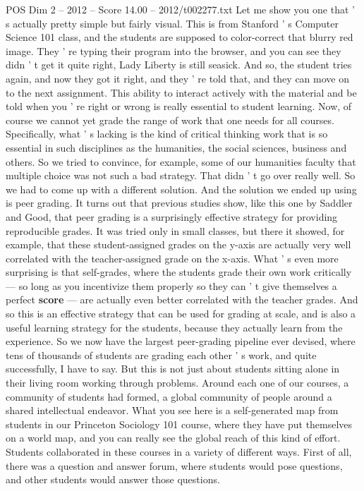 \begin{textsample}{POS Dim 2 – 2012 – Score 14.00 – 2012/t002277.txt}
Let me show you one that ' s actually pretty simple but fairly visual.
This is from Stanford ' s Computer Science 101 class, and the students are supposed to color-correct that blurry red image.
They ' re typing their program into the browser, and you can see they didn ' t get it quite right, Lady Liberty is still seasick.
And so, the student tries again, and now they got it right, and they ' re told that, and they can move on to the next assignment.
This ability to interact actively with the material and be told when you ' re right or wrong is really essential to student learning.
Now, of course we cannot yet grade the range of work that one needs for all courses.
Specifically, what ' s lacking is the kind of critical thinking work that is so essential in such disciplines as the humanities, the social sciences, business and others.
So we tried to convince, for example, some of our humanities faculty that multiple choice was not such a bad strategy.
That didn ' t go over really well.
So we had to come up with a different solution.
And the solution we ended up using is peer grading.
It turns out that previous studies show, like this one by Saddler and Good, that peer grading is a surprisingly effective strategy for providing reproducible grades.
It was tried only in small classes, but there it showed, for example, that these student-assigned grades on the y-axis are actually very well correlated with the teacher-assigned grade on the x-axis.
What ' s even more surprising is that self-grades, where the students grade their own work critically — so long as you incentivize them properly so they can ' t give themselves a perfect \textbf{score} — are actually even better correlated with the teacher grades.
And so this is an effective strategy that can be used for grading at scale, and is also a useful learning strategy for the students, because they actually learn from the experience.
So we now have the largest peer-grading pipeline ever devised, where tens of thousands of students are grading each other ' s work, and quite successfully, I have to say.
But this is not just about students sitting alone in their living room working through problems.
Around each one of our courses, a community of students had formed, a global community of people around a shared intellectual endeavor.
What you see here is a self-generated map from students in our Princeton Sociology 101 course, where they have put themselves on a world map, and you can really see the global reach of this kind of effort.
Students collaborated in these courses in a variety of different ways.
First of all, there was a question and answer forum, where students would pose questions, and other students would answer those questions.

\end{textsample}
